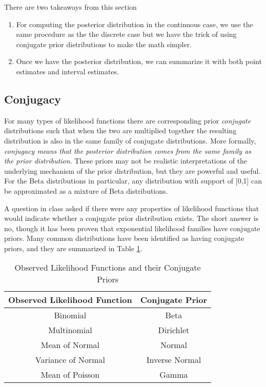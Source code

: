 \documentclass[12pt]{report}
\begin{document}
There are two takeaways from this section

\begin{enumerate}
\item For computing the posterior distribution in the continuous case, we use the same procedure as the the discrete case but we have the trick of using conjugate prior distributions to make the math simpler.
\item Once we have the posterior distribution, we can summarize it with both point estimates and interval estimates.
\end{enumerate}

\subsection{Conjugacy}

 For many types of likelihood functions there are corresponding prior \emph{conjugate} distributions such that when the two are multiplied together the resulting distribution is also in the same family of conjugate distributions. More formally, \emph{conjugacy means that the posterior distribution comes from the same family as the prior distribution}. These priors may not be realistic interpretations of the underlying mechanism of the prior distribution, but they are powerful and useful. For the Beta distributions in particular, any distribution with support of [0,1] can be approximated as a mixture of Beta distributions.

A question in class asked if there were any properties of likelihood functions that would indicate whether a conjugate prior distribution exists. The short answer is no, though it has been proven that exponential likelihood families have conjugate priors. Many common distributions have been identified as having conjugate priors, and they are summarized in Table \ref{tab:test}.

\begin{table}
\begin{center}
\begin{tabular}{|c|c|}\hline
Observed Likelihood Function & Conjugate Prior \\ \hline \hline
Binomial & Beta \\ \hline
Multinomial & Dirichlet \\ \hline
Mean of Normal & Normal \\ \hline
Variance of Normal & Inverse Normal \\ \hline
Mean of Poisson & Gamma \\ \hline
\end{tabular}
\caption{Observed Likelihood Functions and their Conjugate Priors}
\label{tab:test}
\end{center}
\end{table}
\end{document}
